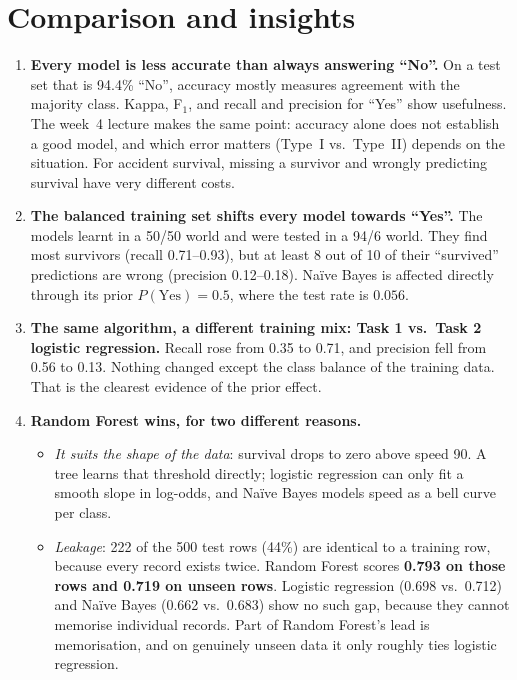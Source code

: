 \documentclass[11pt,a4paper]{article}
\begin{document}
\section{Comparison and insights}\label{sec:insights}

\begin{enumerate}[leftmargin=*]
\item \textbf{Every model is less accurate than always answering ``No''.} On a test set that is 94.4\% ``No'',
  accuracy mostly measures agreement with the majority class. Kappa, F$_1$, and recall and precision for ``Yes'' show
  usefulness. The week~4 lecture makes the same point: accuracy alone does not establish a good model, and which error
  matters (Type~I vs.\ Type~II) depends on the situation. For accident survival, missing a survivor and wrongly
  predicting survival have very different costs.

\item \textbf{The balanced training set shifts every model towards ``Yes''.} The models learnt in a 50/50 world and
  were tested in a 94/6 world. They find most survivors (recall 0.71--0.93), but at least 8 out of 10 of their
  ``survived'' predictions are wrong (precision 0.12--0.18). Naïve Bayes is affected directly through its prior
  $P(\text{Yes}) = 0.5$, where the test rate is $0.056$.

\item \textbf{The same algorithm, a different training mix: Task 1 vs.\ Task 2 logistic regression.} Recall rose from
  0.35 to 0.71, and precision fell from 0.56 to 0.13. Nothing changed except the class balance of the training data.
  That is the clearest evidence of the prior effect.

\item \textbf{Random Forest wins, for two different reasons.}
  \begin{itemize}
    \item \emph{It suits the shape of the data}: survival drops to zero above speed 90. A tree learns that threshold
      directly; logistic regression can only fit a smooth slope in log-odds, and Naïve Bayes models speed as a bell
      curve per class.
    \item \emph{Leakage}: 222 of the 500 test rows (44\%) are identical to a training row, because every record exists
      twice. Random Forest scores \textbf{0.793 on those rows and 0.719 on unseen rows}. Logistic regression (0.698 vs.\
      0.712) and Naïve Bayes (0.662 vs.\ 0.683) show no such gap, because they cannot memorise individual records.
      Part of Random Forest's lead is memorisation, and on genuinely unseen data it only roughly ties logistic
      regression.
  \end{itemize}


\end{enumerate}
\end{document}
